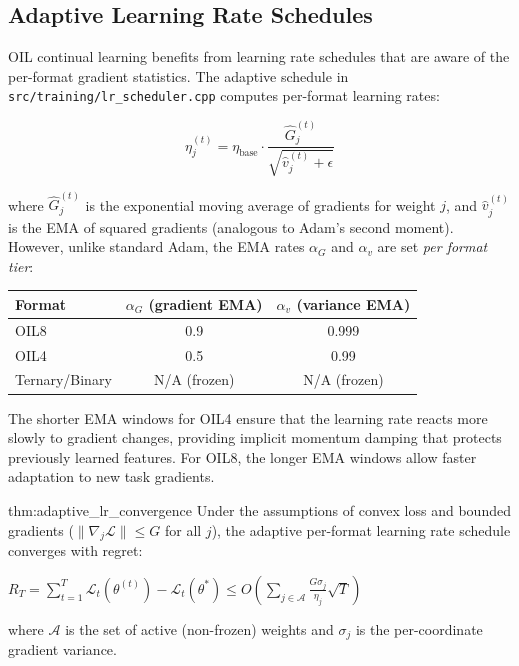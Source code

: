 \subsection{Adaptive Learning Rate Schedules}
\label{sec:adaptive_lr}

OIL continual learning benefits from learning rate schedules that are aware of the per-format gradient statistics. The adaptive schedule in \texttt{src/training/lr\_scheduler.cpp} computes per-format learning rates:

$$\eta_j^{(t)} = \eta_{\text{base}} \cdot \frac{\hat{G}_j^{(t)}}{\sqrt{\hat{v}_j^{(t)} + \epsilon}}$$

where $\hat{G}_j^{(t)}$ is the exponential moving average of gradients for weight $j$, and $\hat{v}_j^{(t)}$ is the EMA of squared gradients (analogous to Adam's second moment). However, unlike standard Adam, the EMA rates $\alpha_G$ and $\alpha_v$ are set \textit{per format tier}:

\begin{center}
\begin{tabular}{lcc}
\toprule
\textbf{Format} & $\alpha_G$ (gradient EMA) & $\alpha_v$ (variance EMA) \\
\midrule
OIL8 & 0.9 & 0.999 \\
OIL4 & 0.5 & 0.99 \\
Ternary/Binary & N/A (frozen) & N/A (frozen) \\
\bottomrule
\end{tabular}
\end{center}

The shorter EMA windows for OIL4 ensure that the learning rate reacts more slowly to gradient changes, providing implicit momentum damping that protects previously learned features. For OIL8, the longer EMA windows allow faster adaptation to new task gradients.

\begin{mythm}{thm:adaptive_lr_convergence}
Under the assumptions of convex loss and bounded gradients ($\|\nabla_j \mathcal{L}\| \leq G$ for all $j$), the adaptive per-format learning rate schedule converges with regret:

$\displaystyle R_T = \sum_{t=1}^T \mathcal{L}_t(\theta^{(t)}) - \mathcal{L}_t(\theta^*) \leq O\left(\sum_{j \in \mathcal{A}} \frac{G \sigma_j}{\eta_j} \sqrt{T}\right)$

where $\mathcal{A}$ is the set of active (non-frozen) weights and $\sigma_j$ is the per-coordinate gradient variance.
\end{mythm}

